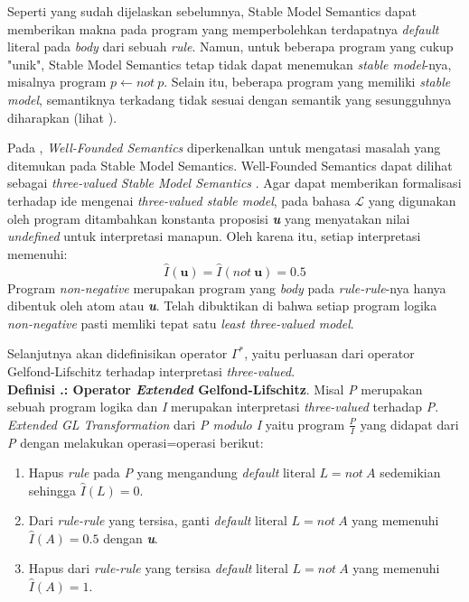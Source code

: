 \noindent Seperti yang sudah dijelaskan sebelumnya, Stable Model Semantics dapat memberikan makna pada program yang memperbolehkan terdapatnya \textit{default} literal pada \textit{body} dari sebuah \textit{rule}. Namun, untuk beberapa program yang cukup "unik", Stable Model Semantics tetap tidak dapat menemukan \textit{stable model}-nya, misalnya program $p \leftarrow not \ p$. Selain itu, beberapa program yang memiliki \textit{stable model}, semantiknya terkadang tidak sesuai dengan semantik yang sesungguhnya diharapkan (lihat \citep{alferes1996reasoning}).

Pada \citep{van1991well}, \textit{Well-Founded Semantics} diperkenalkan untuk mengatasi masalah yang ditemukan pada Stable Model Semantics. Well-Founded Semantics dapat dilihat sebagai \textit{three-valued Stable Model Semantics} \cite{przymusinska1990semantic}. Agar dapat memberikan formalisasi terhadap ide mengenai \textit{three-valued stable model}, pada bahasa $\mathcal{L}$ yang digunakan oleh program ditambahkan konstanta proposisi \textit{\textbf{u}} yang menyatakan nilai \textit{undefined} untuk interpretasi manapun. Oleh karena itu, setiap interpretasi memenuhi:
\begin{displaymath}
\hat{I}(\mathbf{u}) = \hat{I}(not \ \mathbf{u}) = 0.5
\end{displaymath}
Program \textit{non-negative} merupakan program yang \textit{body} pada \textit{rule-rule}-nya hanya dibentuk oleh atom atau \textit{\textbf{u}}. Telah dibuktikan di \citep{przymusinska1990semantic} bahwa setiap program logika \textit{non-negative} pasti memliki tepat satu \textit{least three-valued model}.

Selanjutnya akan didefinisikan operator $\Gamma^*$, yaitu perluasan dari operator Gelfond-Lifschitz terhadap interpretasi \textit{three-valued}.
\\

\noindent \textbf{Definisi \thebabDuaNum.\thedefBabDua: Operator \textit{Extended} Gelfond-Lifschitz}. Misal \textit{P} merupakan sebuah program logika dan \textit{I} merupakan interpretasi \textit{three-valued} terhadap \textit{P}. \textit{Extended GL Transformation} dari \textit{P modulo I} yaitu program $\frac{P}{I}$ yang didapat dari \textit{P} dengan melakukan operasi=operasi berikut:
\begin{enumerate}
	\item Hapus \textit{rule} pada \textit{P} yang mengandung \textit{default} literal $L = not \ A$ sedemikian sehingga $\hat{I}(L) = 0$.
	\item Dari \textit{rule-rule} yang tersisa, ganti \textit{default} literal $L = not \ A$ yang memenuhi $\hat{I}(A) = 0.5$ dengan \textit{\textbf{u}}.
	\item Hapus dari \textit{rule-rule} yang tersisa \textit{default} literal $L = not \ A$ yang memenuhi $\hat{I}(A) = 1$.
\end{enumerate}

